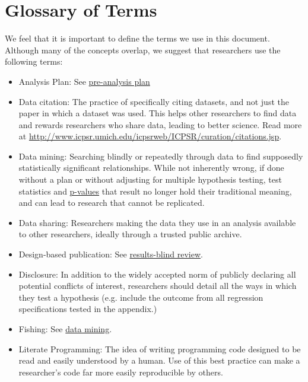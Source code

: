 \documentclass[12pt] {article}
\begin{document}
\section{Glossary of Terms}
We feel that it is important to define the terms we use in this document. Although many of the concepts overlap, we suggest that researchers use the following terms:
\begin{itemize}
\item
Analysis Plan: See \hyperref[def-pap]{pre-analysis plan}

\item
Data citation: The practice of specifically citing datasets, and not just the paper in which a dataset was used.  This helps other researchers to find data and rewards researchers who share data, leading to better science. Read more at \url{http://www.icpsr.umich.edu/icpsrweb/ICPSR/curation/citations.jsp}. 

\item \label{def-mining}
Data mining: Searching blindly or repeatedly through data to find supposedly statistically significant relationships. While not inherently wrong, if done without a plan or without adjusting for multiple hypothesis testing, test statistics and \hyperref[def-pvalue]{p-values} that result no longer hold their traditional meaning, and can lead to research that cannot be replicated.

\item \label{def-datasharing}
Data sharing: Researchers making the data they use in an analysis available to other researchers, ideally through a trusted public archive. 

\item\label{def-dbp}
Design-based publication: See \hyperref[def-rbr]{results-blind review}.

\item
Disclosure: In addition to the widely accepted norm of publicly declaring all potential conflicts of interest, researchers should detail all the ways in which they test a hypothesis (e.g. include the outcome from all regression specifications tested in the appendix.)

\item
Fishing: See \hyperref[def-mining]{data mining}.

\item
Literate Programming: The idea of writing programming code designed to be read and easily understood by a human. Use of this best practice can make a researcher’s code far more easily reproducible by others.


\end{itemize}
\end{document}

